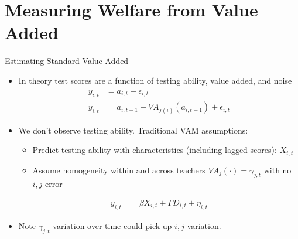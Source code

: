 \documentclass[t,aspectratio=169,11pt]{beamer}
\begin{document}
\section{Measuring Welfare from Value Added}


\begin{frame}{Estimating Standard  Value Added}

\begin{itemize}
    \item In theory test scores are a function of testing ability, value added, and noise
    \begin{align*}
    y_{i,t}  &= a_{i,t} + \epsilon_{i,t} \\
    y_{i,t}  &= a_{i,t-1} + VA_{j(i)}(a_{i,t-1}) + \epsilon_{i,t}
    \end{align*}
 
    \item We don't observe testing ability. Traditional VAM assumptions:
    \begin{itemize}
        \item Predict testing ability with characteristics (including lagged scores): $X_{i,t}$
        \item Assume homogeneity within and across teachers $VA_{j}(\cdot)=\gamma_{j,t}$ with no $i,j$ error
    \end{itemize}
    \begin{align*}
    y_{i,t}  &= \beta X_{i,t} +\Gamma D_{i,t} + \eta_{i,t}
    \end{align*}
    
    \item Note $\gamma_{j,t}$ variation over time could pick up $i,j$ variation.
       
    
\end{itemize}
\end{frame}
\end{document}
